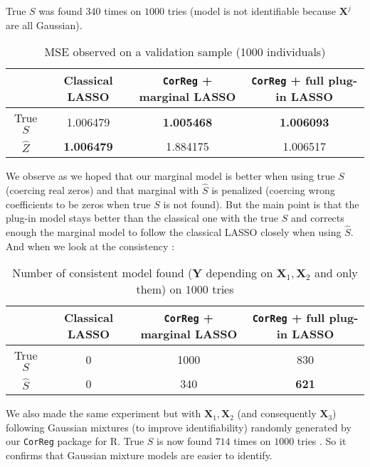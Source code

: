 \documentclass[12pt,a4paper]{report}
\begin{document}
		True $S$ was found $340$ times on $1000$ tries (model is not identifiable because $\boldsymbol{X}^j$ are all Gaussian).
		
		\begin{table}[h!]
		\centering
		\begin{tabular}{|c|c|c|c|}
		\hline 
		 & Classical LASSO & {\tt CorReg} + marginal LASSO& {\tt CorReg} + full plug-in LASSO\\ 
		\hline 
		True $S$ &  1.006479 & \textbf{1.005468} & \textbf{1.006093} \\ 
		\hline 
		$\hat{Z}$ & \textbf{1.006479} & 1.884175 & 1.006517 \\ 
		\hline 
		\end{tabular} 
		\caption{MSE observed on a validation sample (1000 individuals)}
		\end{table}

		We observe as we hoped that our marginal model is better when using true $S$ (coercing real zeros) and that marginal with $\hat{S}$ is penalized (coercing wrong coefficients to be zeros when true $S$ is not found).
		But the main point is that the plug-in model stays better than the classical one with the true $S$ and corrects enough the marginal model to follow the classical LASSO closely when using $\hat{S}$. 
		And when we look at the consistency :
		\begin{table}[h!]	
		\centering
		\begin{tabular}{|c|c|c|c|}
		\hline 
		 & Classical LASSO & {\tt CorReg} + marginal LASSO& {\tt CorReg} + full plug-in LASSO \\ 
		\hline 
		True $S$ &  0 & 1000 & 830 \\ 
		\hline 
		$\hat{S}$ & 0 & 340 & \textbf{621} \\ 
		\hline 
		\end{tabular} 
		\caption{Number of consistent model found ($\boldsymbol{Y}$ depending on $\boldsymbol{X}_1,\boldsymbol{X}_2$ and only them) on $1000$ tries}\label{testidentifiableG}
		\end{table}				
		
		
		We also made the same experiment but with $\boldsymbol{X}_1,\boldsymbol{X}_2$ (and consequently $\boldsymbol{X}_3$) following Gaussian mixtures (to improve identifiability) randomly generated by our {\tt CorReg} package for R. 
		True $S$ is now found $714$ times on $1000$ tries . So it confirms that Gaussian mixture models are easier to identify.
		
\end{document}

